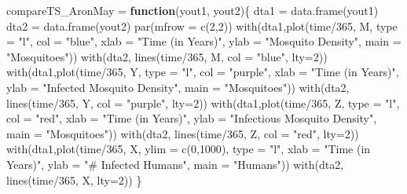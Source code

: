 \documentclass[
]{book}
\newenvironment{Shaded}{\begin{snugshade}}{\end{snugshade}}
\newcommand{\AttributeTok}[1]{\textcolor[rgb]{0.77,0.63,0.00}{#1}}
\newcommand{\ControlFlowTok}[1]{\textcolor[rgb]{0.13,0.29,0.53}{\textbf{#1}}}
\newcommand{\DecValTok}[1]{\textcolor[rgb]{0.00,0.00,0.81}{#1}}
\newcommand{\FunctionTok}[1]{\textcolor[rgb]{0.00,0.00,0.00}{#1}}
\newcommand{\NormalTok}[1]{#1}
\newcommand{\OtherTok}[1]{\textcolor[rgb]{0.56,0.35,0.01}{#1}}
\newcommand{\SpecialCharTok}[1]{\textcolor[rgb]{0.00,0.00,0.00}{#1}}
\newcommand{\StringTok}[1]{\textcolor[rgb]{0.31,0.60,0.02}{#1}}
\begin{document}
\begin{Shaded}
\begin{Highlighting}[]
\NormalTok{compareTS\_AronMay }\OtherTok{=} \ControlFlowTok{function}\NormalTok{(yout1, yout2)\{}
\NormalTok{  dta1 }\OtherTok{=} \FunctionTok{data.frame}\NormalTok{(yout1) }
\NormalTok{  dta2 }\OtherTok{=} \FunctionTok{data.frame}\NormalTok{(yout2) }
  \FunctionTok{par}\NormalTok{(}\AttributeTok{mfrow =} \FunctionTok{c}\NormalTok{(}\DecValTok{2}\NormalTok{,}\DecValTok{2}\NormalTok{))}
  \FunctionTok{with}\NormalTok{(dta1,}\FunctionTok{plot}\NormalTok{(time}\SpecialCharTok{/}\DecValTok{365}\NormalTok{, M, }\AttributeTok{type =} \StringTok{"l"}\NormalTok{, }\AttributeTok{col =} \StringTok{"blue"}\NormalTok{, }
       \AttributeTok{xlab =} \StringTok{"Time (in Years)"}\NormalTok{, }
       \AttributeTok{ylab =} \StringTok{"Mosquito Density"}\NormalTok{, }
       \AttributeTok{main =} \StringTok{"Mosquitoes"}\NormalTok{))}
  \FunctionTok{with}\NormalTok{(dta2, }\FunctionTok{lines}\NormalTok{(time}\SpecialCharTok{/}\DecValTok{365}\NormalTok{, M, }\AttributeTok{col =} \StringTok{"blue"}\NormalTok{, }\AttributeTok{lty=}\DecValTok{2}\NormalTok{))}
  \FunctionTok{with}\NormalTok{(dta1,}\FunctionTok{plot}\NormalTok{(time}\SpecialCharTok{/}\DecValTok{365}\NormalTok{, Y, }\AttributeTok{type =} \StringTok{"l"}\NormalTok{, }\AttributeTok{col =} \StringTok{"purple"}\NormalTok{, }
       \AttributeTok{xlab =} \StringTok{"Time (in Years)"}\NormalTok{, }
       \AttributeTok{ylab =} \StringTok{"Infected Mosquito Density"}\NormalTok{, }
       \AttributeTok{main =} \StringTok{"Mosquitoes"}\NormalTok{))}
  \FunctionTok{with}\NormalTok{(dta2, }\FunctionTok{lines}\NormalTok{(time}\SpecialCharTok{/}\DecValTok{365}\NormalTok{, Y, }\AttributeTok{col =} \StringTok{"purple"}\NormalTok{, }\AttributeTok{lty=}\DecValTok{2}\NormalTok{))}
  \FunctionTok{with}\NormalTok{(dta1,}\FunctionTok{plot}\NormalTok{(time}\SpecialCharTok{/}\DecValTok{365}\NormalTok{, Z, }\AttributeTok{type =} \StringTok{"l"}\NormalTok{, }\AttributeTok{col =} \StringTok{"red"}\NormalTok{, }
       \AttributeTok{xlab =} \StringTok{"Time (in Years)"}\NormalTok{, }
       \AttributeTok{ylab =} \StringTok{"Infectious Mosquito Density"}\NormalTok{, }
       \AttributeTok{main =} \StringTok{"Mosquitoes"}\NormalTok{))}
  \FunctionTok{with}\NormalTok{(dta2, }\FunctionTok{lines}\NormalTok{(time}\SpecialCharTok{/}\DecValTok{365}\NormalTok{, Z, }\AttributeTok{col =} \StringTok{"red"}\NormalTok{, }\AttributeTok{lty=}\DecValTok{2}\NormalTok{))}
  \FunctionTok{with}\NormalTok{(dta1,}\FunctionTok{plot}\NormalTok{(time}\SpecialCharTok{/}\DecValTok{365}\NormalTok{, X, }\AttributeTok{ylim =} \FunctionTok{c}\NormalTok{(}\DecValTok{0}\NormalTok{,}\DecValTok{1000}\NormalTok{), }\AttributeTok{type =} \StringTok{"l"}\NormalTok{, }
       \AttributeTok{xlab =} \StringTok{"Time (in Years)"}\NormalTok{, }
       \AttributeTok{ylab =} \StringTok{"\# Infected Humans"}\NormalTok{, }
       \AttributeTok{main =} \StringTok{"Humans"}\NormalTok{))}
  \FunctionTok{with}\NormalTok{(dta2, }\FunctionTok{lines}\NormalTok{(time}\SpecialCharTok{/}\DecValTok{365}\NormalTok{, X, }\AttributeTok{lty=}\DecValTok{2}\NormalTok{))}
\NormalTok{\}}
\end{Highlighting}
\end{Shaded}
\end{document}
